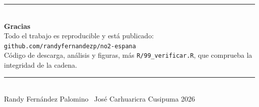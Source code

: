 \documentclass[11pt,aspectratio=169]{beamer}
\begin{document}
\begin{frame}[plain]
\vfill
\hspace*{8mm}\begin{minipage}{0.85\textwidth}
  {\color{azulc}\rule{\textwidth}{1.2pt}}\\[6mm]
  {\Large\color{azul}\bfseries Gracias}\\[7mm]
  {\small Todo el trabajo es reproducible y está publicado:}\\[2mm]
  {\normalsize\color{azul}\texttt{github.com/randyfernandezp/no2-espana}}\\[2mm]
  {\footnotesize\color{gris}Código de descarga, análisis y figuras, más
  \texttt{R/99\_verificar.R}, que comprueba la integridad de la cadena.}\\[7mm]
  {\color{azulc}\rule{\textwidth}{0.5pt}}\\[2mm]
  {\footnotesize\color{gris}Randy Fernández Palomino \textperiodcentered\
  José Carhuaricra Cusipuma \hfill 2026}
\end{minipage}
\vfill
\end{frame}

\appendix
\end{document}

